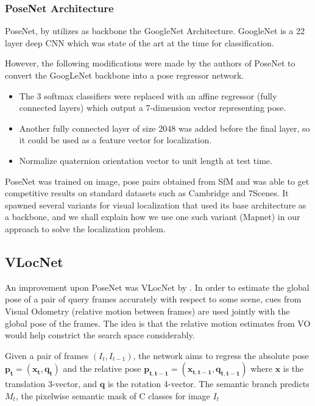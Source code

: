 \subsubsection{PoseNet Architecture}
PoseNet, by \cite{Kendall2015} utilizes as backbone the GoogleNet Architecture. GoogleNet is a 22 layer deep CNN which was state of the art at the time for classification.

However, the following modifications were made by the authors of PoseNet to convert the GoogLeNet backbone into a pose regressor network. 

\begin{itemize}
	\item The 3 softmax classifiers were replaced with an affine regressor (fully connected layers) which output a 7-dimension vector representing pose.\\
	
	\item Another fully connected layer of size 2048 was added before the final layer, so it could be used as a feature vector for localization. \\
	
	\item Normalize quaternion orientation vector to unit length at test time. \\ 
\end{itemize}

PoseNet was trained on image, pose pairs obtained from SfM and was able to get competitive results on standard datasets such as Cambridge and 7Scenes. It spawned several variants for visual localization that used its base architecture as a backbone, and we shall explain how we use one such variant (Mapnet) in our approach to solve the localization problem. 

\subsection{VLocNet} %
An improvement upon PoseNet was VLocNet by \cite{Valada2018}. In order to estimate the global pose of a pair of query frames accurately with respect to some scene, cues from 
Visual Odometry (relative motion between frames) are used jointly with the global pose of the frames. The idea is that the relative motion estimates from VO would help constrict 
the search space considerably. 

Given a pair of frames $(I_t, I_{t-1})$, the network aims to regress the absolute pose $\mathbf{p_t} = \mathbf{(x_t, q_t)}$ and the relative pose 
$\mathbf{p_{t, t-1}} = \mathbf{(x_{t, t-1}, q_{t, t-1})}$ where $\mathbf{x}$ is the translation 3-vector, and $\mathbf{q}$ is the rotation 4-vector. The semantic 
branch predicts $M_t$, the pixelwise semantic mask of C classes for image $I_t$ 

